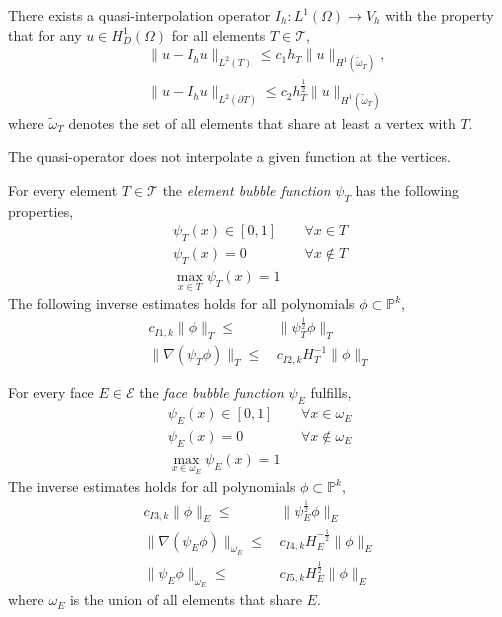 \begin{theorem} \label{def:interpol}
There exists a quasi-interpolation operator $I_h : L^1(\Omega) \rightarrow V_h$ with the property that for any $u \in H^1_D(\Omega)$ for all elements $T\in \mathcal{T}$,
\begin{align*}
& \, \|u - I_h u \|_{L^2(T)} \leq c_1 h_T \|u\|_{H^1(\tilde{\omega}_T)},\\
& \, \|u - I_h u \|_{L^2(\partial T)} \leq c_2 h_T^{\frac{1}{2}} \|u\|_{H^1(\tilde{\omega}_T)}
\end{align*}
where $\tilde{\omega}_T$ denotes the set of all elements that share at least a vertex with $T$. 
\end{theorem}
\begin{remark}
The quasi-operator does not interpolate a given function at the vertices. 
\end{remark}

\begin{definition} \label{def:bubble_est}
For every element $T \in \mathcal{T}$ the \textit{element bubble function} $\psi_T$ has the following properties,
\begin{align*}
\psi_T(x) \in  [0,1] \quad & \,\forall x \in T \\
\psi_T(x) =  0 \quad & \, \forall x \notin T \\
\max_{x \in T} \psi_T(x) = 1 
\end{align*}
The following inverse estimates holds for all polynomials $\phi \subset \mathbb{P}^k$,
\begin{align*}
c_{I1,k}\|\phi \|_T \leq & \, \|\psi_T^{\frac{1}{2}}\phi\|_T \\
\|\nabla(\psi_T\phi) \|_T \leq & \, c_{I2,k}H_T^{-1}\|\phi\|_T
\end{align*}
\end{definition}

\begin{definition} \label{def:bubble_est_edge}
For every face $E \in \mathcal{E}$ the \textit{face bubble function } $\psi_E$ fulfills,
\begin{align*}
\psi_E(x) \in [0,1] \quad & \, \forall x \in \omega_E \\
\psi_E(x) = 0 \quad  & \, \forall x \notin \omega_E \\
\max_{x \in \omega_E} \psi_E(x) = 1 
\end{align*}
The inverse estimates holds for all polynomials $\phi \subset \mathbb{P}^k$,
\begin{align*}
c_{I3,k}\|\phi \|_E \leq & \, \|\psi_E^{\frac{1}{2}}\phi\|_E \\
\|\nabla(\psi_E\phi) \|_{\omega_E} \leq & \, c_{I4,k}H_E^{-\frac{1}{2}}\|\phi\|_E \\
\|\psi_E\phi \|_{\omega_E} \leq & \, c_{I5,k}H_E^{\frac{1}{2}}\|\phi\|_E 
\end{align*}
where $\omega_E$ is the union of all elements that share $E$.
\end{definition}

